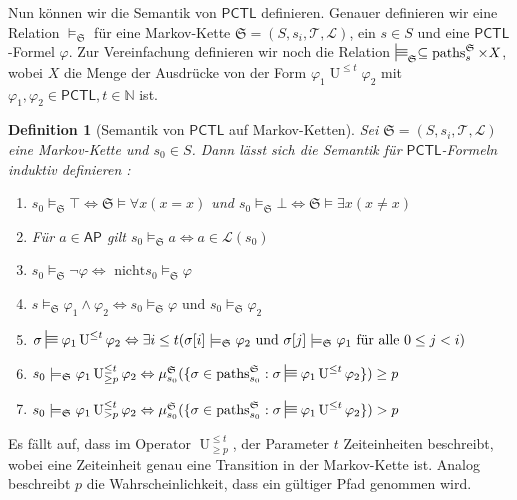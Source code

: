 \documentclass{lni}
\theoremstyle{def_style}
\newtheorem{definition}{Definition}[section]
\theoremstyle{break}
\newcommand{\UEqual}[4]{#1\operatorname{U}^{\leq #2}_{\geq #3}#4}
\newcommand{\UStrict}[4]{#1\operatorname{U}^{\leq #2}_{> #3}#4}
\newcommand{\paths}[2]{\operatorname{paths}^{#1}_{#2}}
\newcommand{\PCTL}{\mathsf{PCTL}}
\begin{document}
Nun können wir die Semantik von $\PCTL$ definieren. Genauer definieren wir eine Relation $\models_\mathfrak{S}$ für eine Markov-Kette $\mathfrak{S}=(S,s_i,\mathcal{T},\mathcal{L})$, ein $s\in S$ und eine $\PCTL$-Formel $\varphi$. Zur Vereinfachung definieren wir noch die Relation $\sttstile{}{}_\mathfrak{S} \subseteq \paths{\mathfrak{S}}{s} \times X$, wobei $X$ die Menge der Ausdrücke von der Form $\varphi_1 \operatorname{U}^{\leq t}\varphi_2$ mit $\varphi_1,\varphi_2 \in \PCTL, t\in \mathbb{N}$ ist.  

\begin{definition}[Semantik von $\PCTL$ auf Markov-Ketten]
	Sei $\mathfrak{S}=(S,s_i,\mathcal{T},\mathcal{L})$ eine Markov-Kette und $s_0\in S$. Dann lässt sich die Semantik für $\PCTL$-Formeln induktiv definieren \cite{hansson1994logic}:
	\begin{enumerate}
		\item $s_0 \models_\mathfrak{S} \top \Leftrightarrow \mathfrak{S}\models \forall x(x=x)$ und $s_0\models_\mathfrak{S} \bot \Leftrightarrow \mathfrak{S}\models \exists x(x\neq x)$
		\item Für $a\in \mathsf{AP}$ gilt $s_0\models_\mathfrak{S} a \Leftrightarrow a\in \mathcal{L}(s_0)$
		\item $s_0 \models_\mathfrak{S}\neg \varphi \Leftrightarrow \text{ nicht} s_0\models_\mathfrak{S} \varphi$
		\item $s\models_\mathfrak{S} \varphi_1\land\varphi_2 \Leftrightarrow s_0\models_\mathfrak{S} \varphi \text{ und } s_0\models_\mathfrak{S} \varphi_2$
		\item $\sigma \sttstile{}{} \varphi_1\operatorname{U}^{\leq t}\varphi_2 \Leftrightarrow \exists i\leq t(\sigma[i]\models_\mathfrak{S} \varphi_2 \text{ und } \sigma[j]\models_\mathfrak{S} \varphi_1 \text{ für alle } 0 \leq j<i)$
		\item $s_0\models_\mathfrak{S} \UEqual{\varphi_1}{t}{p}{\varphi_2} \Leftrightarrow \mu^\mathfrak{S}_{s_0}(\{\sigma \in \paths{\mathfrak{S}}{s_0} : \sigma \sttstile{}{}\varphi_1\operatorname{U}^{\leq t}\varphi_2\})\geq p$
		\item $s_0\models_\mathfrak{S} \UStrict{\varphi_1}{t}{p}{\varphi_2} \Leftrightarrow \mu^\mathfrak{S}_{s_0}(\{\sigma \in \paths{\mathfrak{S}}{s_0} : \sigma \sttstile{}{}\varphi_1\operatorname{U}^{\leq t}\varphi_2\}) > p$
	\end{enumerate}
\end{definition}

Es fällt auf, dass im Operator $\UEqual{}{t}{p}{}$, der Parameter $t$  Zeiteinheiten beschreibt, wobei eine Zeiteinheit genau eine Transition in der Markov-Kette ist. Analog beschreibt $p$ die Wahrscheinlichkeit, dass ein gültiger Pfad \glqq genommen\grqq{} wird.
\end{document}
